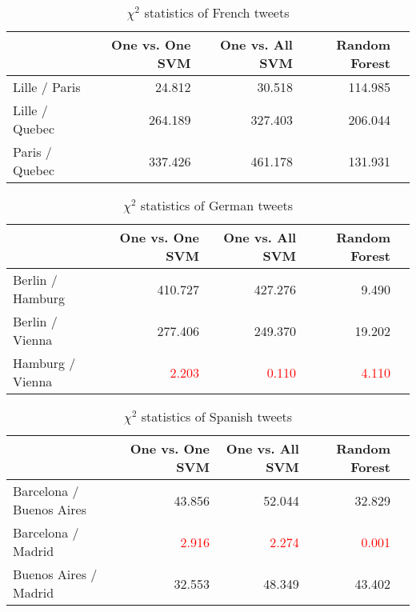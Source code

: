 \begin{table}[ht]
	\caption{$\chi^2$ statistics of French tweets}
	\begin{tabular}{|l|r|r|r|r|} \hline
	{}&One vs. One SVM &One vs. All SVM&Random Forest\\ \hline
	Lille / Paris & 24.812 & 30.518 & 114.985 \\ \hline
	Lille / Quebec & 264.189 & 327.403 & 206.044\\ \hline
	Paris / Quebec & 337.426  & 461.178 &131.931 \\ \hline
	\end{tabular}
	\label{tab:result_chi_fr}
\end{table}

\begin{table}[ht]
	\caption{$\chi^2$ statistics of German tweets}
	\begin{tabular}{|l|r|r|r|r|} \hline
	{}&One vs. One SVM &One vs. All SVM&Random Forest\\ \hline
	Berlin / Hamburg & 410.727 & 427.276 & 9.490 \\ \hline
	Berlin / Vienna & 277.406 & 249.370 & 19.202\\ \hline
	Hamburg / Vienna &\textcolor{red}{2.203} &\textcolor{red}{0.110}  &\textcolor{red}{4.110} \\ \hline
	\end{tabular}
	\label{tab:result_chi_de}
\end{table}

\begin{table}[ht]
	\caption{$\chi^2$ statistics of Spanish tweets}
	\begin{tabular}{|l|r|r|r|r|} \hline
	{}&One vs. One SVM &One vs. All SVM&Random Forest\\ \hline
	Barcelona / Buenos Aires& 43.856& 52.044 & 32.829 \\ \hline
	Barcelona / Madrid &\textcolor{red}{2.916} &\textcolor{red}{2.274}  & \textcolor{red}{0.001}\\ \hline
	Buenos Aires / Madrid & 32.553& 48.349& 43.402 \\ \hline
	\end{tabular}
	\label{tab:result_chi_es}
\end{table}




